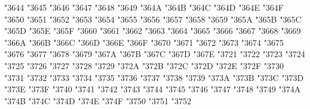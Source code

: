 {\Uchar\jis"3644 %
\Uchar\jis"3645 %
\Uchar\jis"3646 %
\Uchar\jis"3647 %
\Uchar\jis"3648 %
\Uchar\jis"3649 %
\Uchar\jis"364A %
\Uchar\jis"364B %
\Uchar\jis"364C %
\Uchar\jis"364D %
\Uchar\jis"364E %
\Uchar\jis"364F %
\Uchar\jis"3650 %
\Uchar\jis"3651 %
\Uchar\jis"3652 %
\Uchar\jis"3653 %
\Uchar\jis"3654 %
\Uchar\jis"3655 %
\Uchar\jis"3656 %
\Uchar\jis"3657 %
\Uchar\jis"3658 %
\Uchar\jis"3659 %
\Uchar\jis"365A %
\Uchar\jis"365B %
\Uchar\jis"365C %
\Uchar\jis"365D %
\Uchar\jis"365E %
\Uchar\jis"365F %
\Uchar\jis"3660 %
\Uchar\jis"3661 %
\Uchar\jis"3662 %
\Uchar\jis"3663 %
\Uchar\jis"3664 %
\Uchar\jis"3665 %
\Uchar\jis"3666 %
\Uchar\jis"3667 %
\Uchar\jis"3668 %
\Uchar\jis"3669 %
\Uchar\jis"366A %
\Uchar\jis"366B %
\Uchar\jis"366C %
\Uchar\jis"366D %
\Uchar\jis"366E %
\Uchar\jis"366F %
\Uchar\jis"3670 %
\Uchar\jis"3671 %
\Uchar\jis"3672 %
\Uchar\jis"3673 %
\Uchar\jis"3674 %
\Uchar\jis"3675 %
\Uchar\jis"3676 %
\Uchar\jis"3677 %
\Uchar\jis"3678 %
\Uchar\jis"3679 %
\Uchar\jis"367A %
\Uchar\jis"367B %
\Uchar\jis"367C %
\Uchar\jis"367D %
\Uchar\jis"367E %
\Uchar\jis"3721 %
\Uchar\jis"3722 %
\Uchar\jis"3723 %
\Uchar\jis"3724 %
\Uchar\jis"3725 %
\Uchar\jis"3726 %
\Uchar\jis"3727 %
\Uchar\jis"3728 %
\Uchar\jis"3729 %
\Uchar\jis"372A %
\Uchar\jis"372B %
\Uchar\jis"372C %
\Uchar\jis"372D %
\Uchar\jis"372E %
\Uchar\jis"372F %
\Uchar\jis"3730 %
\Uchar\jis"3731 %
\Uchar\jis"3732 %
\Uchar\jis"3733 %
\Uchar\jis"3734 %
\Uchar\jis"3735 %
\Uchar\jis"3736 %
\Uchar\jis"3737 %
\Uchar\jis"3738 %
\Uchar\jis"3739 %
\Uchar\jis"373A %
\Uchar\jis"373B %
\Uchar\jis"373C %
\Uchar\jis"373D %
\Uchar\jis"373E %
\Uchar\jis"373F %
\Uchar\jis"3740 %
\Uchar\jis"3741 %
\Uchar\jis"3742 %
\Uchar\jis"3743 %
\Uchar\jis"3744 %
\Uchar\jis"3745 %
\Uchar\jis"3746 %
\Uchar\jis"3747 %
\Uchar\jis"3748 %
\Uchar\jis"3749 %
\Uchar\jis"374A %
\Uchar\jis"374B %
\Uchar\jis"374C %
\Uchar\jis"374D %
\Uchar\jis"374E %
\Uchar\jis"374F %
\Uchar\jis"3750 %
\Uchar\jis"3751 %
\Uchar\jis"3752 %
}

